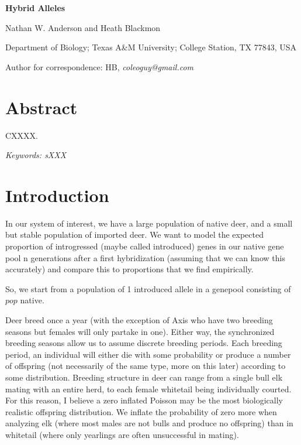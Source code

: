 \documentclass[12pt]{article}
\begin{document}

\begin{center}
\textbf{Hybrid Alleles}

Nathan W. Anderson and Heath Blackmon
\end{center}

\noindent
Department of Biology; Texas A\&M University; College Station, TX 77843, USA

\noindent
Author for correspondence: HB, \textit{coleoguy@gmail.com}







\section{Abstract}

CXXXX.


\bigskip
\noindent
\textit{Keywords: sXXX}


\clearpage



\linenumbers


\section{Introduction}
In our system of interest, we have a large population of native deer, and a small but stable population of imported deer. We want to model the expected proportion of introgressed (maybe called introduced) genes in our native gene pool n generations after a first hybridization (assuming that we can know this accurately) and compare this to proportions that we find empirically.  

So, we start from a population of 1 introduced allele in a genepool consisting of $pop$ native. 

Deer breed once a year (with the exception of Axis who have two breeding seasons but females will only partake in one). Either way, the synchronized breeding seasons allow us to assume discrete breeding periods. Each breeding period, an individual will either die with some probability or produce a number of offspring (not necessarily of the same type, more on this later) according to some distribution. Breeding structure in deer can range from a single bull elk mating with an entire herd, to each female whitetail being individually courted. For this reason, I believe a zero inflated Poisson may be the most biologically realistic offspring distribution. We inflate the probability of zero more when analyzing elk (where most males are not bulls and produce no offspring) than in whitetail (where only yearlings are often unsuccessful in mating).
\end{document}
